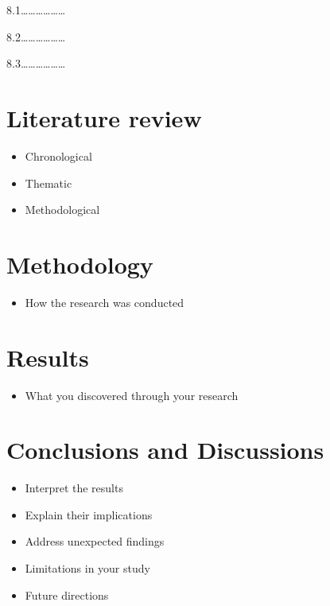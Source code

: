 \documentclass[
  letterpaper,
  DIV=11,
  numbers=noendperiod]{scrreprt}
\providecommand{\tightlist}{%
  \setlength{\itemsep}{0pt}\setlength{\parskip}{0pt}}\usepackage{longtable,booktabs,array}
\begin{document}
8.1\ldots\ldots\ldots\ldots\ldots\ldots{}

8.2\ldots\ldots\ldots\ldots\ldots\ldots{}

8.3\ldots\ldots\ldots\ldots\ldots\ldots{}


\chapter{Literature review}\label{literature-review}

\begin{itemize}
\item
  Chronological
\item
  Thematic
\item
  Methodological
\end{itemize}


\chapter{Methodology}\label{methodology}

\begin{itemize}
\tightlist
\item
  How the research was conducted
\end{itemize}


\chapter{Results}\label{results}

\begin{itemize}
\tightlist
\item
  What you discovered through your research
\end{itemize}


\chapter{Conclusions and Discussions}\label{conclusions-and-discussions}

\begin{itemize}
\item
  Interpret the results
\item
  Explain their implications
\item
  Address unexpected findings
\item
  Limitations in your study
\item
  Future directions
\end{itemize}
\end{document}
